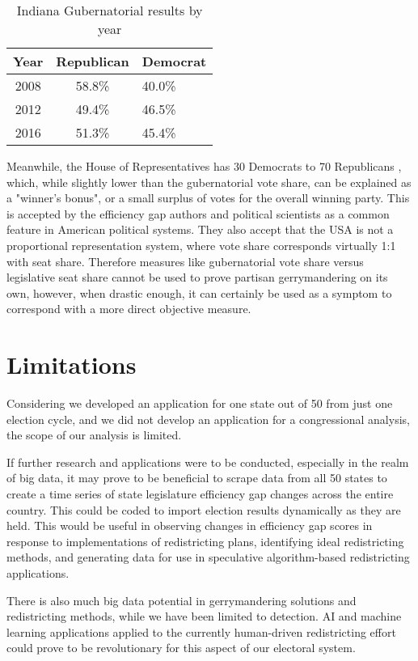 \documentclass[sigconf]{acmart}
\begin{document}
\begin{table}
\caption{Indiana Gubernatorial results by year}
\label{tab:freq}
    \begin{tabular}{ccl}
    \hline
    Year & Republican & Democrat \\
    \hline
    2008 & 58.8\%  & 40.0\% \\
    \hline
    2012 & 49.4\% & 46.5\% \\
    \hline
    2016 & 51.3\% & 45.4\% \\
    \hline
    \end{tabular}
\end{table}

Meanwhile, the House of Representatives has 30 Democrats to 70 Republicans \cite{houseresults}, which, while slightly lower than the gubernatorial vote share, can be explained as a "winner's bonus", or a small surplus of votes for the overall winning party. This is accepted by the efficiency gap authors and political scientists as a common feature in American political systems. They also accept that the USA is not a proportional representation system, where vote share corresponds virtually 1:1 with seat share.\cite{chicagoformula} Therefore measures like gubernatorial vote share versus legislative seat share cannot be used to prove partisan gerrymandering on its own, however, when drastic enough, it can certainly be used as a symptom to correspond with a more direct objective measure.

\section{Limitations}
Considering we developed an application for one state out of 50 from just one election cycle, and we did not develop an application for a congressional analysis, the scope of our analysis is limited.

If further research and applications were to be conducted, especially in the realm of big data, it may prove to be beneficial to scrape data from all 50 states to create a time series of state legislature efficiency gap changes across the entire country. This could be coded to import election results dynamically as they are held. This would be useful in observing changes in efficiency gap scores in response to implementations of redistricting plans, identifying ideal redistricting methods, and generating data for use in speculative algorithm-based redistricting applications.

There is also much big data potential in gerrymandering solutions and redistricting methods, while we have been limited to detection. AI and machine learning applications applied to the currently human-driven redistricting effort could prove to be revolutionary for this aspect of our electoral system. 
\end{document}
